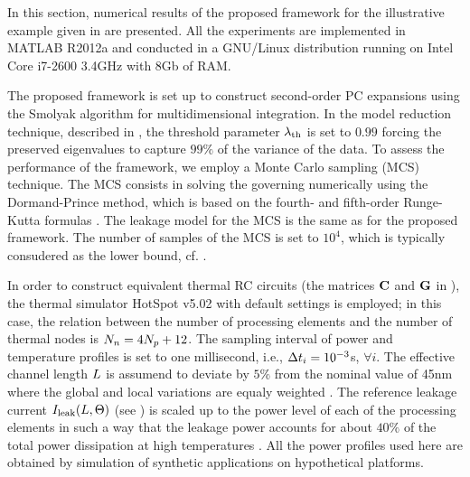In this section, numerical results of the proposed framework for the illustrative example given in  are presented. All the experiments are implemented in MATLAB R2012a \cite{matlab} and conducted in a GNU/Linux distribution running on Intel Core i7-2600 3.4GHz with 8Gb of RAM.

The proposed framework is set up to construct second-order PC expansions using the Smolyak algorithm for multidimensional integration. In the model reduction technique, described in , the threshold parameter $\lambda_\text{th}$ is set to $0.99$ forcing the preserved eigenvalues to capture $99\%$ of the variance of the data. To assess the performance of the framework, we employ a Monte Carlo sampling (MCS) technique. The MCS consists in solving the governing  numerically using the Dormand-Prince method, which is based on the fourth- and fifth-order Runge-Kutta formulas \cite{press2007}. The leakage model for the MCS is the same as for the proposed framework. The number of samples of the MCS is set to $10^4$, which is typically consudered as the lower bound, cf. \cite{xiu2009, bhardwaj2006}.

In order to construct equivalent thermal RC circuits (the matrices $\mC$ and $\mG$ in ), the thermal simulator HotSpot v5.02 \cite{hotspot} with default settings is employed; in this case, the relation between the number of processing elements and the number of thermal nodes is ${N_n} = 4 {N_p} + 12$. The sampling interval of power and temperature profiles is set to one millisecond, i.e., $\Delta t_i = 10^{-3}$s, $\forall i$. The effective channel length $L$ is assumend to deviate by $5\%$ from the nominal value of 45nm where the global and local variations are equaly weighted \cite{juan2012}. The reference leakage current $I_{\text{leak}}(L, \Theta)$ (see ) is scaled up to the power level of each of the processing elements in such a way that the leakage power accounts for about $40\%$ of the total power dissipation at high temperatures \cite{liu2007}. All the power profiles used here are obtained by simulation of synthetic applications on hypothetical platforms.

